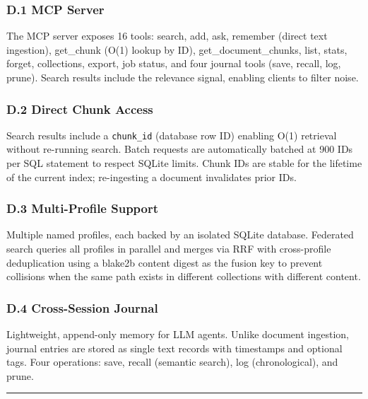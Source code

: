 \documentclass[
  11pt]{article}
\begin{document}
\subsubsection{D.1 MCP Server}\label{d.1-mcp-server}

The MCP server exposes 16 tools: search, add, ask, remember (direct text ingestion), get\_chunk (O(1) lookup by ID), get\_document\_chunks, list, stats, forget, collections, export, job status, and four journal tools (save, recall, log, prune). Search results include the relevance signal, enabling clients to filter noise.

\subsubsection{D.2 Direct Chunk Access}\label{d.2-direct-chunk-access}

Search results include a \texttt{chunk\_id} (database row ID) enabling O(1) retrieval without re-running search. Batch requests are automatically batched at 900 IDs per SQL statement to respect SQLite limits. Chunk IDs are stable for the lifetime of the current index; re-ingesting a document invalidates prior IDs.

\subsubsection{D.3 Multi-Profile Support}\label{d.3-multi-profile-support}

Multiple named profiles, each backed by an isolated SQLite database. Federated search queries all profiles in parallel and merges via RRF with cross-profile deduplication using a blake2b content digest as the fusion key to prevent collisions when the same path exists in different collections with different content.

\subsubsection{D.4 Cross-Session Journal}\label{d.4-cross-session-journal}

Lightweight, append-only memory for LLM agents. Unlike document ingestion, journal entries are stored as single text records with timestamps and optional tags. Four operations: save, recall (semantic search), log (chronological), and prune.

\begin{center}\rule{0.5\linewidth}{0.5pt}\end{center}
\end{document}
